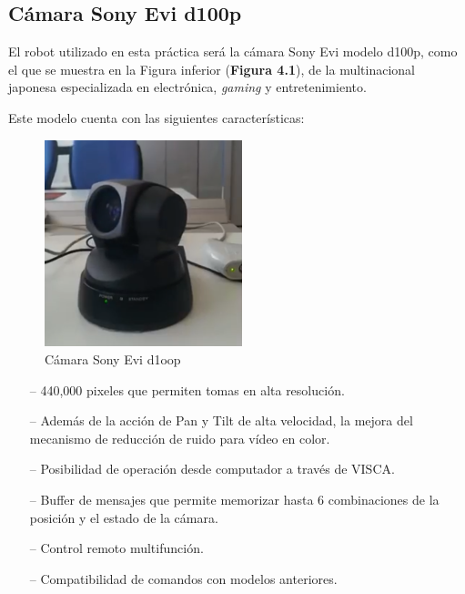 \subsection{Cámara Sony Evi d100p}
El robot utilizado en esta práctica será la cámara Sony Evi modelo d100p, como el que se muestra en la Figura inferior (\textbf{Figura 4.1}), de la multinacional japonesa especializada en electrónica, \textit{gaming} y entretenimiento.

Este modelo cuenta con las siguientes características:
\begin{multicols}{2}
\begin{figure}[H]
  \begin{center}
    \includegraphics[width=0.88\linewidth, height=6.0cm]{figures/sonyevi.png}
		\caption{Cámara Sony Evi d1oop}
		\label{fig.sonyevi}
		\end{center}
\end{figure}
\begin{itemize}
	\item[--] 440,000 pixeles que permiten tomas en alta resolución.
	\item[--] Además de la acción de Pan y Tilt de alta velocidad, la mejora del mecanismo de reducción de ruido para vídeo en color. 
	\item[--] Posibilidad de operación desde computador a través de VISCA.
	\item[--] Buffer de mensajes que permite memorizar hasta 6 combinaciones de la posición y el estado de la cámara. 
	\item[--] Control remoto multifunción. 
	\item[--] Compatibilidad de comandos con modelos anteriores.
\end{itemize}
\end{multicols}

